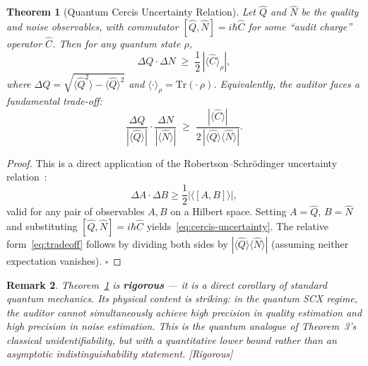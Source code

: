 \documentclass[12pt,a4paper]{article}
\newtheorem{theorem}{Theorem}[section]
\newtheorem{remark}[theorem]{Remark}
\newcommand{\rigorous}{\textcolor{green!50!black}{\small\textsf{[Rigorous]}}}
\newcommand{\Tr}{\mathrm{Tr}}
\begin{document}
\begin{theorem}[Quantum Cercis Uncertainty Relation]
\label{thm:uncertainty}
Let $\hat{Q}$ and $\hat{N}$ be the quality and noise observables, with
commutator $[\hat{Q},\hat{N}]=i\hbar\hat{C}$ for some ``audit charge''
operator $\hat{C}$.  Then for any quantum state $\rho$,
\begin{equation}\label{eq:cercis-uncertainty}
    \Delta Q \cdot \Delta N \;\geq\;
    \frac{1}{2}\,|\langle\hat{C}\rangle_\rho|,
\end{equation}
where $\Delta Q = \sqrt{\langle\hat{Q}^2\rangle-\langle\hat{Q}\rangle^2}$
and $\langle\cdot\rangle_\rho = \Tr(\cdot\,\rho)$.  Equivalently, the auditor
faces a fundamental trade-off:
\begin{equation}\label{eq:tradeoff}
    \frac{\Delta Q}{|\langle\hat{Q}\rangle|}
    \cdot \frac{\Delta N}{|\langle\hat{N}\rangle|}
    \;\geq\; \frac{|\langle\hat{C}\rangle|}
                  {2\,|\langle\hat{Q}\rangle\langle\hat{N}\rangle|}.
\end{equation}
\end{theorem}

\begin{proof}
This is a direct application of the Robertson--Schr\"odinger uncertainty
relation~\citep{robertson1929uncertainty}:
\begin{equation}\label{eq:robertson}
    \Delta A \cdot \Delta B \geq
    \frac12|\langle[A,B]\rangle|,
\end{equation}
valid for any pair of observables $A,B$ on a Hilbert space.
Setting $A=\hat{Q}$, $B=\hat{N}$ and substituting
$[\hat{Q},\hat{N}]=i\hbar\hat{C}$ yields~\eqref{eq:cercis-uncertainty}.
The relative form~\eqref{eq:tradeoff} follows by dividing both sides by
$|\langle\hat{Q}\rangle\langle\hat{N}\rangle|$ (assuming neither expectation
vanishes). $\square$
\end{proof}

\begin{remark}
Theorem~\ref{thm:uncertainty} is \textbf{rigorous} — it is a direct corollary
of standard quantum mechanics.  Its physical content is striking: in the
quantum SCX regime, the auditor cannot simultaneously achieve high precision
in quality estimation \emph{and} high precision in noise estimation.  This is
the quantum analogue of Theorem~3's classical unidentifiability, but with a
\emph{quantitative lower bound} rather than an asymptotic indistinguishability
statement.  \rigorous
\end{remark}
\end{document}
